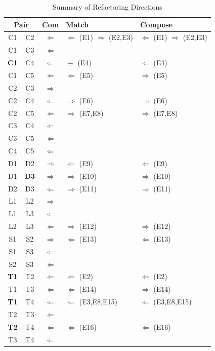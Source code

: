 
\begin{table}[t]
\caption{Summary of Refactoring Directions \label{summaryResults}}
\begin{center}
\begin{tabular}{|c@{ }c | c  l l @{}|} \hline
\multicolumn{2}{|c|}{\textbf{Pair}} & \textbf{Com} & \textbf{Match} & \textbf{Compose} \\ \hline \hline
C1 & C2 & $\Leftarrow$  & $\Leftarrow$ (E1) $\Rightarrow$ (E2,E3) & $\Leftarrow$ (E1) $\Rightarrow$ (E2,E3)\\
C1 & C3 & $\Leftarrow$ & & \\
\textbf{C1} & C4 & $\Leftarrow$ & $\equiv$ (E4) & $\Leftarrow$  (E4)\\
C1 & C5 & $\Leftarrow$ & $\Leftarrow$ (E5) & $\Rightarrow$ (E5) \\
C2 & C3 & $\Rightarrow$ & & \\
C2 & C4 & $\Leftarrow$ & $\Rightarrow$ (E6) & $\Rightarrow$ (E6)\\
C2 & C5 & $\Leftarrow$ & $\Rightarrow$ (E7,E8) & $\Rightarrow$ (E7,E8)\\
C3 & C4 & $\Leftarrow$ & & \\
C3 & C5 & $\Leftarrow$ & & \\
C4 & C5 & $\Leftarrow$ & & \\
\hline
D1 & D2 & $\Rightarrow$ & $\Leftarrow$ (E9)& $\Leftarrow$ (E9) \\
D1 & \textbf{D3} & $\Rightarrow$ & $\Rightarrow$ (E10)& $\Rightarrow$ (E10) \\
D2 & D3 & $\Leftarrow$ & $\Rightarrow$ (E11) & $\Rightarrow$ (E11) \\
\hline
L1 & L2 & $\Rightarrow$ & & \\
L1 & L3 & $\Leftarrow$ & & \\
L2 & L3 & $\Leftarrow$ & $\Rightarrow$ (E12) & $\Rightarrow$ (E12)  \\
\hline 
S1 & S2 & $\Rightarrow$ & $\Leftarrow$ (E13) & $\Leftarrow$ (E13) \\
S1 & S3 & $\Leftarrow$ & & \\
S2 & S3 & $\Leftarrow$ & & \\
\hline 
\textbf{T1} & T2 & $\Leftarrow$  & $\Leftarrow$ (E2)& $\Leftarrow$ (E2) \\
T1 & T3 & $\Leftarrow$ & $\Leftarrow$ (E14) & $\Rightarrow$ (E14)\\
\textbf{T1} & T4 & $\Leftarrow$ & $\Leftarrow$ (E3,E8,E15) & $\Leftarrow$ (E3,E8,E15)\\
T2 & T3 & $\Leftarrow$ & & \\
\textbf{T2} & T4 & $\Leftarrow$ & $\Leftarrow$ (E16) & $\Leftarrow$ (E16)\\
T3 & T4 & $\Leftarrow$ & & \\
\hline


\end{tabular}
\end{center}
\end{table}


